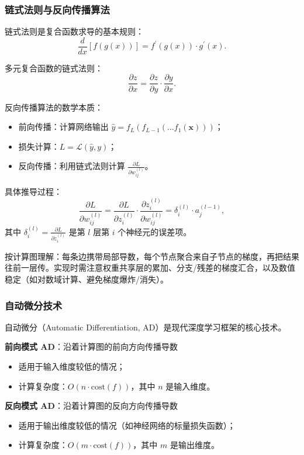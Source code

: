 \begin{itemize}
\subsubsection{链式法则与反向传播算法}

链式法则是复合函数求导的基本规则：
$$\frac{d}{dx}[f(g(x))] = f^\prime(g(x)) \cdot g^\prime(x).$$

多元复合函数的链式法则：
$$\frac{\partial z}{\partial x} = \frac{\partial z}{\partial y} \cdot \frac{\partial y}{\partial x}.$$

反向传播算法的数学本质：
\begin{itemize}
  \item 前向传播：计算网络输出 $\hat{y} = f_L(f_{L-1}(\ldots f_1(\mathbf{x})))$；
  \item 损失计算：$L = \mathcal{L}(\hat{y}, y)$；
  \item 反向传播：利用链式法则计算 $\frac{\partial L}{\partial w_{ij}^{(l)}}$。
\end{itemize} 

具体推导过程：
$$
\frac{\partial L}{\partial w_{ij}^{(l)}} = \frac{\partial L}{\partial z_i^{(l)}} \cdot \frac{\partial z_i^{(l)}}{\partial w_{ij}^{(l)}} = \delta_i^{(l)} \cdot a_j^{(l-1)},
$$
其中 $\delta_i^{(l)} = \frac{\partial L}{\partial z_i^{(l)}}$ 是第 $l$ 层第 $i$ 个神经元的误差项。

按计算图理解：每条边携带局部导数，每个节点聚合来自子节点的梯度，再把结果往前一层传。实现时需注意权重共享层的累加、分支/残差的梯度汇合，以及数值稳定（如对数域计算、避免梯度爆炸/消失）。

\subsubsection{自动微分技术}

自动微分（Automatic Differentiation, AD）是现代深度学习框架的核心技术。

\textbf{前向模式 AD}：沿着计算图的前向方向传播导数
\begin{itemize}
  \item 适用于输入维度较低的情况；
  \item 计算复杂度：$O(n \cdot \text{cost}(f))$，其中 $n$ 是输入维度。
\end{itemize}

\textbf{反向模式 AD}：沿着计算图的反向方向传播导数
\begin{itemize}
  \item 适用于输出维度较低的情况（如神经网络的标量损失函数）；
  \item 计算复杂度：$O(m \cdot \text{cost}(f))$，其中 $m$ 是输出维度。
\end{itemize}


\end{itemize}
